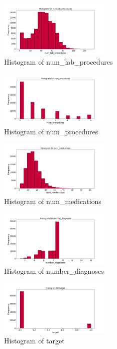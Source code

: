 \documentclass{article}%
\begin{document}
%


\begin{figure}[h!]%
\centering%
\includegraphics[width=200px]{eda/histograms/num_lab_procedures_histogram.png}%
\caption{Histogram of num\_lab\_procedures}%
\end{figure}

%


\begin{figure}[h!]%
\centering%
\includegraphics[width=200px]{eda/histograms/num_procedures_histogram.png}%
\caption{Histogram of num\_procedures}%
\end{figure}

%


\begin{figure}[h!]%
\centering%
\includegraphics[width=200px]{eda/histograms/num_medications_histogram.png}%
\caption{Histogram of num\_medications}%
\end{figure}

%


\begin{figure}[h!]%
\centering%
\includegraphics[width=200px]{eda/histograms/number_diagnoses_histogram.png}%
\caption{Histogram of number\_diagnoses}%
\end{figure}

%


\begin{figure}[h!]%
\centering%
\includegraphics[width=200px]{eda/histograms/target_histogram.png}%
\caption{Histogram of target}%
\end{figure}

%
\end{document}
